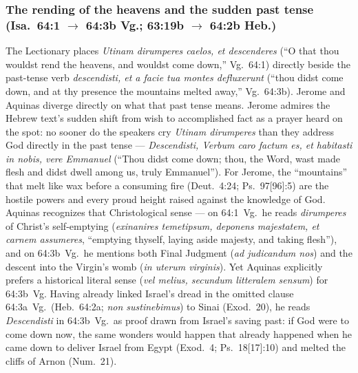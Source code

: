 \subsubsection{The rending of the heavens and the sudden past tense (Isa.~64:1 $\to$ 64:3b Vg.; 63:19b $\to$ 64:2b Heb.)}
The Lectionary places \emph{Utinam dirumperes caelos, et descenderes} (``O that thou wouldst rend the heavens, and wouldst come down,'' Vg.~64:1) directly beside the past-tense verb \emph{descendisti, et a facie tua montes defluxerunt} (``thou didst come down, and at thy presence the mountains melted away,'' Vg.~64:3b). Jerome and Aquinas diverge directly on what that past tense means. Jerome admires the Hebrew text's sudden shift from wish to accomplished fact as a prayer heard on the spot: no sooner do the speakers cry \emph{Utinam dirumperes} than they address God directly in the past tense --- \emph{Descendisti, Verbum caro factum es, et habitasti in nobis, vere Emmanuel} (``Thou didst come down; thou, the Word, wast made flesh and didst dwell among us, truly Emmanuel''). For Jerome, the ``mountains'' that melt like wax before a consuming fire (Deut.~4:24; Ps.~97[96]:5) are the hostile powers and every proud height raised against the knowledge of God. Aquinas recognizes that Christological sense --- on 64:1~Vg.\ he reads \emph{dirumperes} of Christ's self-emptying (\emph{exinanires temetipsum, deponens majestatem, et carnem assumeres}, ``emptying thyself, laying aside majesty, and taking flesh''), and on 64:3b~Vg.\ he mentions both Final Judgment (\emph{ad judicandum nos}) and the descent into the Virgin's womb (\emph{in uterum virginis}). Yet Aquinas explicitly prefers a historical literal sense (\emph{vel melius, secundum litteralem sensum}) for 64:3b~Vg. Having already linked Israel's dread in the omitted clause 64:3a~Vg.\ (Heb.~64:2a; \emph{non sustinebimus}) to Sinai (Exod.~20), he reads \emph{Descendisti} in 64:3b~Vg.\ as proof drawn from Israel's saving past: if God were to come down now, the same wonders would happen that already happened when he came down to deliver Israel from Egypt (Exod.~4; Ps.~18[17]:10) and melted the cliffs of Arnon (Num.~21).

